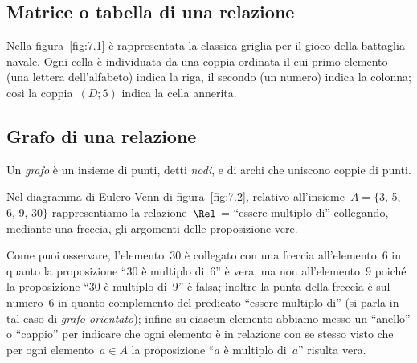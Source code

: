 \ovalbox{\risolvii \ref{ese:7.7}, \ref{ese:7.8}}

\subsection{Matrice o tabella di una relazione}

Nella figura~\ref{fig:7.1} è rappresentata la classica griglia per il gioco della battaglia navale.
Ogni cella è individuata da una coppia ordinata il cui primo elemento (una lettera dell'alfabeto) indica la riga,
il secondo (un numero) indica la colonna; così la coppia~$(D;5)$ indica la cella annerita.

\ovalbox{\risolvii \ref{ese:7.9}, \ref{ese:7.10}, \ref{ese:7.11}}

\subsection{Grafo di una relazione}

\begin{definizione}
Un \emph{grafo} è un insieme di punti, detti \emph{nodi}, e di archi che uniscono coppie di punti.
\end{definizione}


\begin{exrig}
 \begin{esempio}

Nel diagramma di Eulero-Venn di figura~\ref{fig:7.2}, relativo all'insieme~$A = \{$3, 5, 6, 9, 30$\}$
rappresentiamo la relazione~$\Rel$ = ``essere multiplo di'' collegando, mediante una freccia, gli argomenti delle proposizione vere.

Come puoi osservare, l'elemento~30 è collegato con una freccia all'elemento~6 in quanto la proposizione ``30 è multiplo di~6'' è vera, ma non all'elemento~9
poiché la proposizione ``30 è multiplo di~9'' è falsa; inoltre la punta della freccia è sul numero~6 in quanto complemento del predicato ``essere multiplo di'' (si parla in tal caso di \emph{grafo orientato});
infine su ciascun elemento abbiamo messo un ``anello'' o ``cappio'' per indicare che ogni elemento è in relazione con se stesso visto che per ogni
elemento~$a \in A$ la proposizione ``$a$ è multiplo di~$a$'' risulta vera.

 \end{esempio}
\end{exrig}

